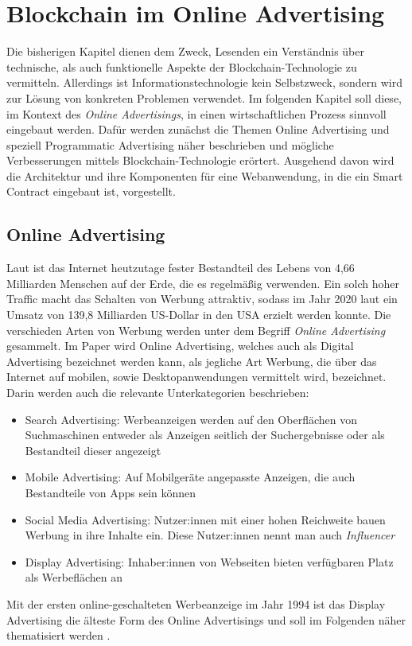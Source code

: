 \chapter{Blockchain im Online Advertising}
Die bisherigen Kapitel dienen dem Zweck, Lesenden ein Verständnis über technische, als auch funktionelle Aspekte der Blockchain-Technologie zu vermitteln. Allerdings ist Informationstechnologie kein Selbstzweck, sondern wird zur Lösung von konkreten Problemen verwendet.
Im folgenden Kapitel soll diese, im Kontext des \emph{Online Advertisings}, in einen wirtschaftlichen Prozess sinnvoll eingebaut werden. 
Dafür werden zunächst die Themen Online Advertising und speziell Programmatic Advertising näher beschrieben und mögliche Verbesserungen mittels Blockchain-Technologie erörtert. 
Ausgehend davon wird die Architektur und ihre Komponenten für eine Webanwendung, in die ein Smart Contract eingebaut ist, vorgestellt. 
\section{Online Advertising}
Laut \cite{johnson_2021} ist das Internet heutzutage fester Bestandteil des Lebens von 4,66 Milliarden Menschen auf der Erde, die es regelmäßig verwenden. Ein solch hoher Traffic macht das Schalten von Werbung attraktiv, sodass im Jahr 2020 laut \cite{statista_online_advertisement_revenue_2021} ein Umsatz von 139,8 Milliarden US-Dollar in den USA erzielt werden konnte. Die verschieden Arten von Werbung werden unter dem Begriff \emph{Online Advertising} gesammelt.
Im Paper \cite{bundeskartellamt_2018} wird Online Advertising, welches auch als Digital Advertising bezeichnet werden kann, als jegliche Art Werbung, die über das Internet auf mobilen, sowie Desktopanwendungen vermittelt wird, bezeichnet. Darin werden auch die relevante Unterkategorien beschrieben: 
\begin{itemize}
	\item Search Advertising: Werbeanzeigen werden auf den Oberflächen von Suchmaschinen entweder als Anzeigen seitlich der Suchergebnisse oder als Bestandteil dieser angezeigt
	\item Mobile Advertising: Auf Mobilgeräte angepasste Anzeigen, die auch Bestandteile von Apps sein können
	\item Social Media Advertising:
	Nutzer:innen mit einer hohen Reichweite bauen Werbung in ihre Inhalte ein. Diese Nutzer:innen nennt man auch \emph{Influencer}
	\item Display Advertising: Inhaber:innen von Webseiten bieten verfügbaren Platz als Werbeflächen an
\end{itemize}
Mit der ersten online-geschalteten Werbeanzeige im Jahr 1994 ist das Display Advertising die älteste Form des Online Advertisings und soll im Folgenden näher thematisiert werden \cite{bundeskartellamt_2018}.
